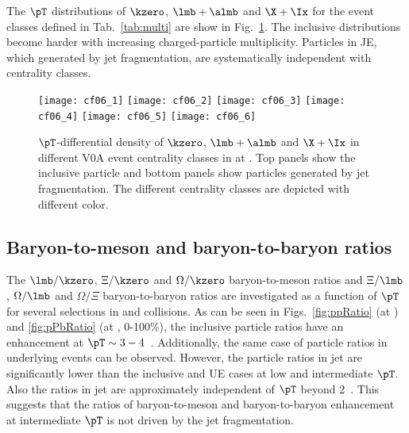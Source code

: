 \documentclass[ALICE,manyauthors]{cernphprep}
\begin{document}
The $\pT$ distributions of $\kzero$, $\lmb + \almb$ and $\X + \Ix$ for the event classes defined in Tab.~\ref{tab:multi} are show in Fig.~\ref{fig:pPbSpectwCent}. The inclusive distributions become harder with increasing charged-particle multiplicity. Particles in JE, which generated by jet fragmentation, are systematically independent with centrality classes.
\begin{figure}[!ht]
	\begin{center}
		\texttt{[image: cf06\_1]}
		\texttt{[image: cf06\_2]}
		\texttt{[image: cf06\_3]}
		\texttt{[image: cf06\_4]}
		\texttt{[image: cf06\_5]}
		\texttt{[image: cf06\_6]}
	\end{center}
	\caption{$\pT$-differential density of $\kzero$, $\lmb + \almb$ and $\X + \Ix$ in different V0A event centrality classes in \pPb at \fivenn. Top panels show the inclusive particle and bottom panels show particles generated by jet fragmentation. The different centrality classes are depicted with different color.}
	\label{fig:pPbSpectwCent}
\end{figure}

\subsection{Baryon-to-meson and baryon-to-baryon ratios}
\label{subsec:ParRatios}
The $\lmb/\kzero$, $\Xi/\kzero$ and $\Omega/\kzero$ baryon-to-meson ratios and $\Xi/\lmb$, $\Omega/\lmb$ and $\Omega/\Xi$ baryon-to-baryon ratios are investigated as a function of $\pT$ for several selections in \pp and \pPb collisions. As can be seen in Figs.~\ref{fig:ppRatio} (\pp at \thirteen) and \ref{fig:pPbRatio} (\pPb at \fivenn, 0-100\%), the inclusive particle ratios have an enhancement at $\pT \sim 3 - 4 $~\GeVc. Additionally, the same case of particle ratios in underlying events can be observed. However, the particle ratios in jet are significantly lower than the inclusive and UE cases at low and intermediate $\pT$. Also the ratios in jet are approximately independent of $\pT$ beyond 2~\GeVc. This suggests that the ratios of baryon-to-meson and baryon-to-baryon enhancement at intermediate $\pT$ is not driven by the jet fragmentation.
\end{document}
